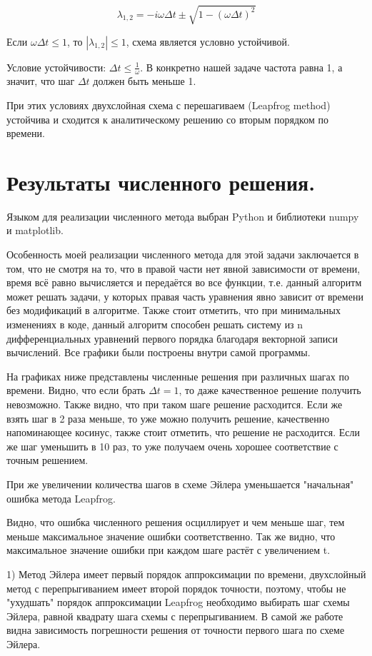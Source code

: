 \documentclass[diploma]{nanolab2015}
\begin{document}
$$\lambda_{1,2} = -i \omega \Delta t \pm \sqrt{1-(\omega \Delta t)^2}$$

Если $ \omega \Delta t \leq 1$, то  $|\lambda_{1,2} | \leq 1$, схема является условно устойчивой.

Условие устойчивости: $\Delta t	\leq \frac{1}{\omega}$. В конкретно нашей задаче частота равна 1, а значит, что шаг  $\Delta t$ должен быть меньше 1.

При этих условиях двухслойная схема с перешагиваем (Leapfrog method) устойчива и сходится к аналитическому решению со вторым порядком по времени.

\section{Результаты численного решения.}

Языком для реализации численного метода выбран Python и библиотеки numpy и matplotlib.

Особенность моей реализации численного метода для этой задачи заключается в том, что  не смотря на то, что в правой части нет явной зависимости от времени, время всё равно вычисляется и передаётся во все функции, т.е. данный алгоритм может решать задачи, у которых правая часть уравнения явно зависит от времени без модификаций в алгоритме. Также стоит отметить, что при минимальных изменениях в коде, данный алгоритм способен решать систему из n дифференциальных уравнений первого порядка благодаря векторной записи вычислений. Все графики были построены внутри самой программы.

На графиках ниже представлены численные решения при различных шагах по времени. Видно, что если брать $\Delta t = 1$, то даже качественное решение получить невозможно. Также видно, что при таком шаге решение расходится. Если же взять шаг в 2 раза меньше, то уже можно получить решение, качественно напоминающее косинус, также стоит отметить, что решение не расходится. Если же шаг уменьшить в 10 раз, то уже получаем очень хорошее соответствие с точным решением.  

При же увеличении количества шагов в схеме Эйлера уменьшается "начальная" ошибка метода Leapfrog.

Видно, что ошибка численного решения осциллирует и чем меньше шаг, тем меньше максимальное значение ошибки соответственно. Так же видно, что максимальное значение ошибки при каждом шаге растёт с увеличением t.

1) Метод Эйлера имеет первый порядок аппроксимации по времени, двухслойный метод с перепрыгиванием имеет второй порядок точности, поэтому, чтобы не "ухудшать" порядок аппроксимации Leapfrog необходимо выбирать шаг схемы Эйлера, равной квадрату шага схемы с перепрыгиванием. В самой же работе видна зависимость погрешности решения от точности первого шага по схеме Эйлера.
\end{document}
